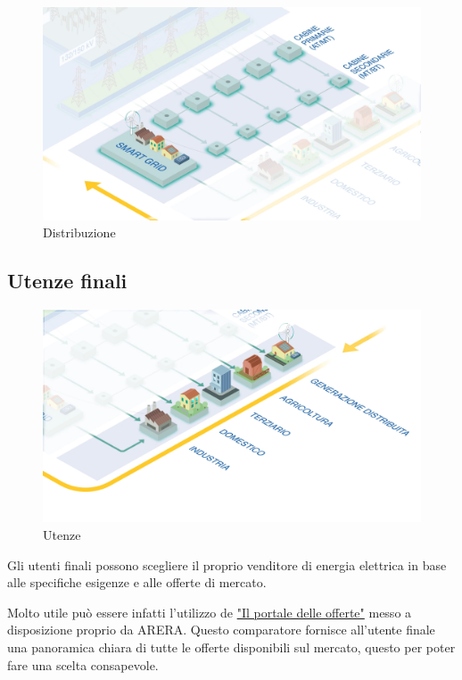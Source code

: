 \begin{figure}[h!]
    \centering
    \includegraphics[width=0.9\linewidth]{img/Terna-Distribuzione.png}
    \caption{Distribuzione}
\end{figure}


\newpage
\subsection{Utenze finali}

\begin{figure}[h!]
    \centering
    \includegraphics[width=0.9\linewidth]{img/Terna-Utenze.png}
    \caption{Utenze}
\end{figure}


Gli utenti finali possono scegliere il proprio venditore di energia elettrica in base alle specifiche esigenze e alle offerte di mercato.

Molto utile può essere infatti l'utilizzo de \href{https://www.ilportaleofferte.it/portaleOfferte/}{"Il portale delle offerte"} messo a disposizione proprio da ARERA. Questo comparatore fornisce all'utente finale una panoramica chiara di tutte le offerte disponibili sul mercato, questo per poter fare una scelta consapevole.


